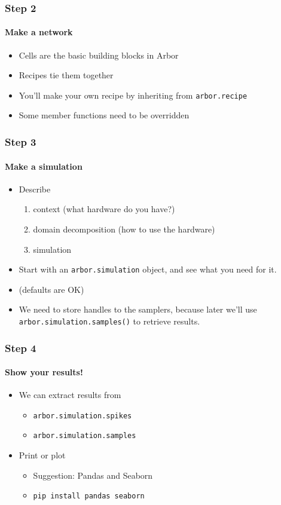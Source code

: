 \documentclass[t]{beamer}
\begin{document}
\begin{frame}
    \frametitle{Step 2}
    \framesubtitle{Make a network}
    \begin{itemize}
        \item Cells are the basic building blocks in Arbor
        \item Recipes tie them together
        \item You’ll make your own recipe by inheriting from \texttt{arbor.recipe}
        \item Some member functions need to be overridden
    \end{itemize}
\end{frame}


\begin{frame}
    \frametitle{Step 3}
    \framesubtitle{Make a simulation}
    \begin{itemize}
        \item Describe
        \begin{enumerate}
            \item context (what hardware do you have?)
            \item domain decomposition (how to use the hardware)
            \item simulation
        \end{enumerate}
        \item Start with an \texttt{arbor.simulation} object, and see what you need for it.
        \item (defaults are OK)
        \item We need to store handles to the samplers, because later we’ll use \texttt{arbor.simulation.samples()} to retrieve results.
    \end{itemize}
\end{frame}


\begin{frame}
    \frametitle{Step 4}
    \framesubtitle{Show your results!}
    \begin{itemize}
        \item We can extract results from
        \begin{itemize}
            \item \texttt{arbor.simulation.spikes}
            \item \texttt{arbor.simulation.samples}
        \end{itemize}
        \item Print or plot
        \begin{itemize}
            \item Suggestion: Pandas and Seaborn
            \item \texttt{pip install pandas seaborn}
        \end{itemize}
    \end{itemize}
\end{frame}
\end{document}
